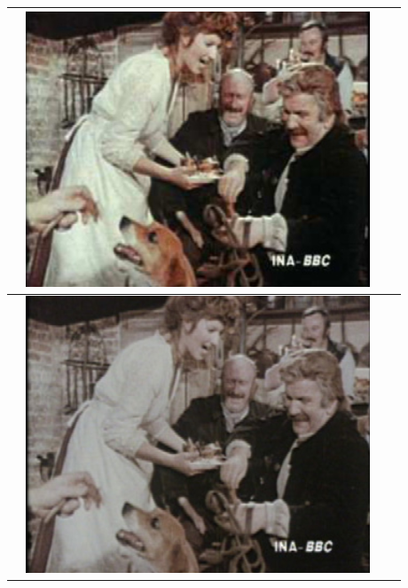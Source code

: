 \begin{longtable}{|N||c|c|c|}
\begin{minipage}{.29\textwidth}
  \end{minipage} & 
  \begin{minipage}{.29\textwidth}
    \includegraphics[width=\textwidth,height=\textheight,keepaspectratio]{images/pitie_result1}
  \end{minipage} \\
    \hline  \label{row:pitie_demo_2} &
  \begin{minipage}{.29\textwidth}
    \includegraphics[width=\textwidth,height=\textheight,keepaspectratio]{images/pitie_original}
  \end{minipage} & 
  \begin{minipage}{.29\textwidth}

\end{minipage}
\end{longtable}
